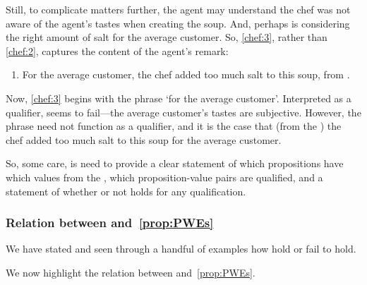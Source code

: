 \begin{note}
  Still, to complicate matters further, the agent may understand the chef was not aware of the agent's tastes when creating the soup.
  And, perhaps is considering the right amount of salt for the average customer.
  So, \ref{chef:3}, rather than \ref{chef:2}, captures the content of the agent's remark:

  \begin{enumerate}[label=\arabic*, ref=(\arabic*), resume]
  \item
    \label{chef:3}
    For the average customer, the chef added too much salt to this soup, from \agpe{}.
  \end{enumerate}

  Now, \ref{chef:3} begins with the phrase `for the average customer'.
  Interpreted as a qualifier, \ptivity{} seems to fail---the average customer's tastes are subjective.
  However, the phrase need not function as a qualifier, and it is the case that (from the \agpe{}) the chef added too much salt to this soup for the average customer.
\end{note}

\begin{note}
  So, some care, is need to provide a clear statement of which propositions have which values from the \agpe{}, which proposition-value pairs are qualified, and a statement of whether or not \ptivity{} holds for any qualification.
\end{note}

\subsubsection{Relation between \ptivity{} and~\autoref{prop:PWEs}}
\label{cha:zSpA:sec:ptivity-prop}

\begin{note}
  We have stated \ptivity{} and seen through a handful of examples how \ptivity{} hold or fail to hold.

  We now highlight the relation between \ptivity{} and~\autoref{prop:PWEs}.
\end{note}

